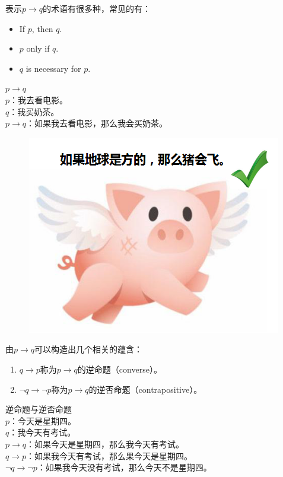 \documentclass[12pt, openany, oneside]{book}
\begin{document}
表示$ p \rightarrow q $的术语有很多种，常见的有：

\begin{itemize}
	\item If $ p $, then $ q $.
	\item $ p $ only if $ q $.
	\item $ q $ is necessary for $ p $.
\end{itemize}

\begin{tcolorbox}
	$ p \rightarrow q $ \\
	$ p $：我去看电影。 \\
	$ q $：我买奶茶。 \\
	$ p \rightarrow q $：如果我去看电影，那么我会买奶茶。
\end{tcolorbox}

\begin{figure}[H]
	\centering
	\includegraphics[scale=0.7]{img/C1/1-2/1.png}
\end{figure}

由$ p \rightarrow q $可以构造出几个相关的蕴含：

\begin{enumerate}
	\item $ q \rightarrow p $称为$ p \rightarrow q $的逆命题（converse）。
	\item $ \neg q \rightarrow \neg p $称为$ p \rightarrow q $的逆否命题（contrapositive）。
\end{enumerate}

\begin{tcolorbox}
	逆命题与逆否命题 \\
	$ p $：今天是星期四。 \\
	$ q $：我今天有考试。 \\
	$ p \rightarrow q $：如果今天是星期四，那么我今天有考试。 \\
	$ q \rightarrow p $：如果我今天有考试，那么果今天是星期四。 \\
	$ \neg q \rightarrow \neg p $：如果我今天没有考试，那么今天不是星期四。
\end{tcolorbox}
\end{document}
